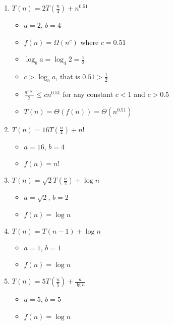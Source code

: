 \documentclass[11pt]{article}
\begin{document}
\begin{enumerate}[label=\Alph*.]
	\item $T(n) = 2T(\frac{n}{4}) + n^{0.51}$
	
	\begin{itemize}
	
		\item $a = 2$, $b = 4$
		\item $f(n) = \Omega(n^c)$ where $c = 0.51$
		\item $\log_b a = \log_4 2 = \frac{1}{2}$
		\item $c > \log_b a$, that is $0.51 > \frac{1}{2}$
		\item $\frac{n^{0.51}}{2} \leq c n^{0.51}$ for any constant $c < 1$ and $c > 0.5$
		\item $T (n) = \Theta(f(n)) = \Theta (n^{0.51})$
	
	\end{itemize}
	
	\item $T(n) = 16 T(\frac{n}{4}) + n!$
	
	\begin{itemize}
	
		\item $a = 16$, $b = 4$
		\item $f(n) = n!$
	
	\end{itemize}
	
	\item $T(n) = \sqrt{2} T(\frac{n}{2}) + \log n$
	
	\begin{itemize}
	
		\item $a = \sqrt{2}$, $b = 2$
		\item $f(n) = \log n$
	
	\end{itemize}
	
	\item $T(n) = T(n-1) + \log n$
	
	\begin{itemize}
	
		\item $a = 1$, $b = 1$
		\item $f(n) = \log n$
	
	\end{itemize}
	
	\item $T(n) = 5T(\frac{n}{5}) + \frac{n}{\lg n}$
	
	\begin{itemize}
	
		\item $a = 5$, $b = 5$
		\item $f(n) = \log n$
	
	\end{itemize}
	
\end{enumerate}
\end{document}
